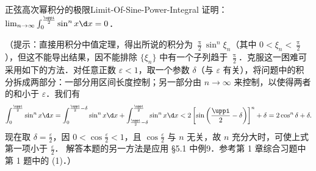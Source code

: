 \begin{problem}{正弦高次幂积分的极限}{Limit-Of-Sine-Power-Integral}
    证明：$\lim_{n\to \infty} \int_0^{\frac{\uppi}{2}} \sin^n x \d x = 0$．

    （提示：直接用积分中值定理，得出所说的积分为 $\frac{\uppi}{2} \sin^n \xi_n$（其中 $0 < \xi_n < \frac{\uppi}{2}$），但这不能导出结果，因不能排除 $\{\xi_n\}$ 中有一个子列趋于 $\frac{\uppi}{2}$．克服这一困难可采用如下的方法．对任意正数 $\varepsilon < 1$，取一个参数 $\delta$（与 $\varepsilon$ 有关），将问题中的积分拆成两部分：一部分用区间长度控制；另一部分由 $n \to \infty$ 来控制，以使得两者的和小于 $\varepsilon$．我们有
    \begin{equation}
        \int_0^{\frac{\uppi}{2}} \sin^n x \d x = \int_0^{\frac{\uppi}{2} - \delta} \sin^n x \d x + \int_{\frac{\uppi}{2} - \delta}^{\frac{\uppi}{2}} \sin^n x \d x < 2\left[ \sin\left(\frac{\uppi}{2} - \delta\right) \right]^n + \delta = 2\cos^n \delta + \delta.
    \end{equation}
    现在取 $\delta = \frac{\varepsilon}{2}$，因 $0 < \cos\frac{\varepsilon}{2} < 1$，且 $\cos\frac{\varepsilon}{2}$ 与 $n$ 无关，故 $n$ 充分大时，可使上式第一项小于 $\frac{\varepsilon}{2}$．
    解答本题的另一方法是应用 \S5.1 中例9．参考第 1 章综合习题中第 1 题中的 (1)．）
\end{problem}

